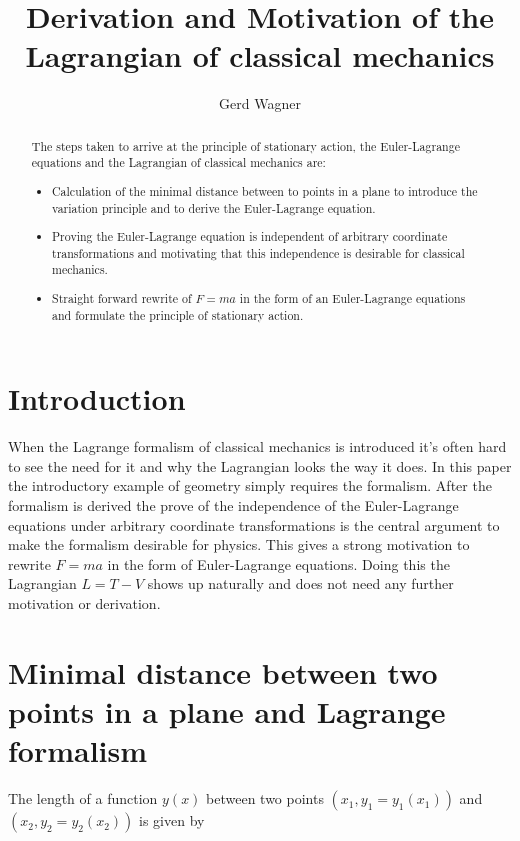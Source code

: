 \documentclass{article}
\begin{document}
\title{Derivation and Motivation of the Lagrangian of classical mechanics}
\author{Gerd Wagner}

\maketitle

\begin{abstract}
The steps taken to arrive at the principle of stationary action, the Euler-Lagrange equations and the Lagrangian of classical mechanics are:
\begin{itemize}
\item Calculation of the minimal distance between to points in a plane to introduce the variation principle and to derive the Euler-Lagrange equation.
\item Proving the Euler-Lagrange equation is independent of arbitrary coordinate transformations and motivating that this independence is desirable for classical mechanics.
\item Straight forward rewrite of $F=ma$ in the form of an Euler-Lagrange equations and formulate the principle of stationary action.
\end{itemize}
\end{abstract}


\section{Introduction}

When the Lagrange formalism of classical mechanics is introduced it's often hard to see the need for it and why the Lagrangian looks the way it does. In this paper the introductory example of geometry simply requires the formalism. 
After the formalism is derived the prove of the independence of the Euler-Lagrange equations under arbitrary coordinate transformations is the central argument to make the formalism desirable for physics.
This gives a strong motivation to rewrite $F=ma$ in the form of Euler-Lagrange equations. Doing this the Lagrangian $L=T-V$ shows up naturally and does not need any further motivation or derivation.

\section{Minimal distance between two points in a plane and Lagrange formalism \cite{Klopper}} 
The length of a function $y(x)$ between two points $(x_1,y_1=y_1(x_1))$ and $(x_2,y_2=y_2(x_2))$ is given by 
\end{document}
